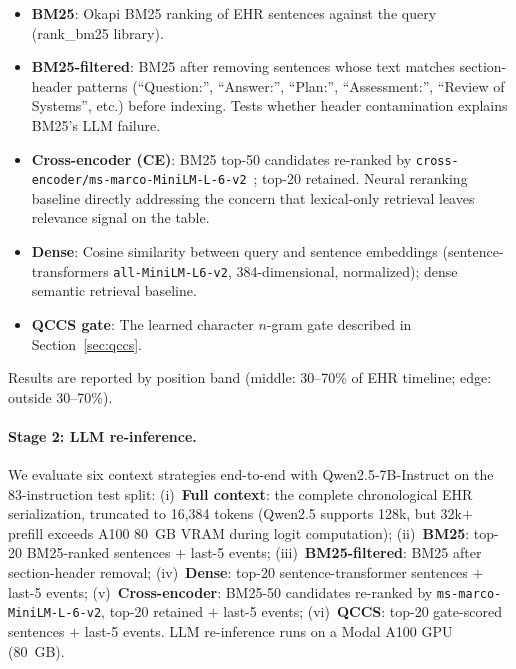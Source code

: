 \documentclass{article}
\begin{document}
\begin{itemize}[leftmargin=*, topsep=1pt, itemsep=0pt]
  \item \textbf{BM25}: Okapi BM25 ranking of EHR sentences against the query
    (rank\_bm25 library).
  \item \textbf{BM25-filtered}: BM25 after removing sentences whose text
    matches section-header patterns (``Question:'', ``Answer:'', ``Plan:'',
    ``Assessment:'', ``Review of Systems'', etc.) before indexing. Tests whether
    header contamination explains BM25's LLM failure.
  \item \textbf{Cross-encoder (CE)}: BM25 top-50 candidates re-ranked by
    \texttt{cross-encoder/ms-marco-MiniLM-L-6-v2}~\cite{reimers2019sentence};
    top-20 retained. Neural reranking baseline directly addressing the concern
    that lexical-only retrieval leaves relevance signal on the table.
  \item \textbf{Dense}: Cosine similarity between query and sentence embeddings
    (sentence-transformers \texttt{all-MiniLM-L6-v2}, 384-dimensional, normalized);
    dense semantic retrieval baseline.
  \item \textbf{QCCS gate}: The learned character $n$-gram gate described in
    Section~\ref{sec:qccs}.
\end{itemize}
Results are reported by position band (middle: 30--70\% of EHR timeline; edge:
outside 30--70\%).

\paragraph{Stage 2: LLM re-inference.} We evaluate six context strategies
end-to-end with Qwen2.5-7B-Instruct on the 83-instruction test split:
(i)~\textbf{Full context}: the complete chronological EHR serialization, truncated to
16,384 tokens (Qwen2.5 supports 128k, but 32k$+$ prefill exceeds A100 80~GB
VRAM during logit computation); (ii)~\textbf{BM25}: top-20 BM25-ranked
sentences $+$ last-5 events; (iii)~\textbf{BM25-filtered}: BM25 after
section-header removal; (iv)~\textbf{Dense}: top-20 sentence-transformer
sentences $+$ last-5 events; (v)~\textbf{Cross-encoder}: BM25-50 candidates
re-ranked by \texttt{ms-marco-MiniLM-L-6-v2}, top-20 retained $+$ last-5 events;
(vi)~\textbf{QCCS}: top-20 gate-scored sentences $+$ last-5 events.
LLM re-inference runs on a Modal A100 GPU (80~GB).
\end{document}
